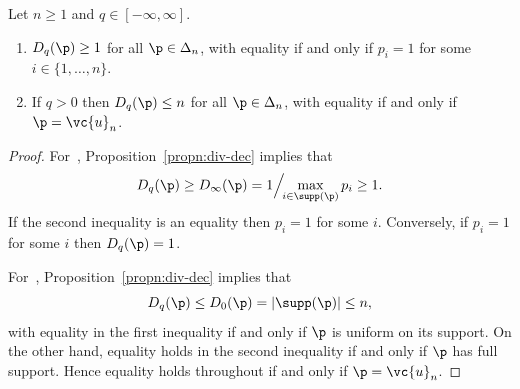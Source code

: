 \begin{lemma}
% 
Let $n \geq 1$ and $q \in [-\infty, \infty]$.
% 
\begin{enumerate}
\item 
{}
$D_q(\p) \geq 1$ for all $\p \in \Delta_n$, with equality if and only if
$p_i = 1$ for some $i \in \{1, \ldots, n\}$.

\item
{}
If $q > 0$ then $D_q(\p) \leq n$ for all $\p \in \Delta_n$, with
equality if and only if $\p = \vc{u}_n$.
\end{enumerate}
\end{lemma}

\begin{proof}
For~, Proposition~\ref{propn:div-dec} implies that
\[
D_q(\p)
\geq
D_{\infty}(\p)
=
1\Big/\!\!\max_{i \in \supp(\p)} p_i 
\geq 
1.
\]
If the second inequality is an equality then $p_i = 1$ for some $i$.
Conversely, if $p_i = 1$ for some $i$ then $D_q(\p) = 1$.

For~, Proposition~\ref{propn:div-dec} implies that
\[
D_q(\p)
\leq 
D_0(\p)
=
|\supp(\p)|
\leq 
n,
\]
with equality in the first inequality if and only if $\p$ is uniform on its
support.  On the other hand, equality holds in the second inequality if and
only if $\p$ has full support.  Hence equality holds throughout if and only
if $\p = \vc{u}_n$.
\end{proof}

